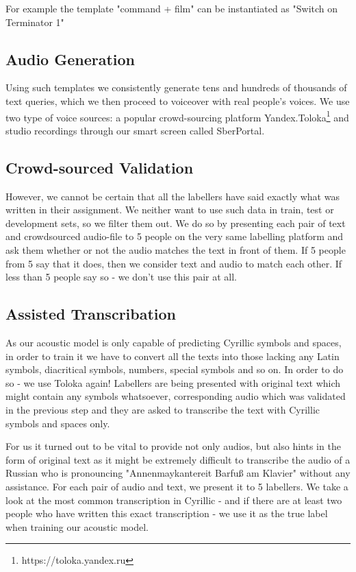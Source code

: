 \documentclass[a4paper]{article}
\begin{document}
For example the template "command + film" can be instantiated as "Switch on Terminator 1"


\subsection{Audio Generation}
Using such templates we consistently generate tens and hundreds of thousands of text queries, which we then proceed to voiceover with real people's voices. We use two type of voice sources: a popular crowd-sourcing platform Yandex.Toloka\footnote{https://toloka.yandex.ru} and studio recordings through our smart screen called SberPortal.

\subsection{Crowd-sourced Validation}
However, we cannot be certain that all the labellers have said exactly what was written in their assignment. We neither want to use such data in train, test or development sets, so we filter them out. We do so by presenting each pair of text and crowdsourced audio-file to 5 people on the very same labelling platform and ask them whether or not the audio matches the text in front of them. If 5 people from 5 say that it does, then we consider text and audio to match each other. If less than 5 people say so - we don't use this pair at all.

\subsection{Assisted Transcribation}
As our acoustic model is only capable of predicting Cyrillic symbols and spaces, in order to train it we have to convert all the texts into those lacking any Latin symbols, diacritical symbols, numbers, special symbols and so on. In order to do so - we use Toloka again! Labellers are being presented with original text which might contain any symbols whatsoever, corresponding audio which was validated in the previous step and they are asked to transcribe the text with Cyrillic symbols and spaces only. 

For us it turned out to be vital to provide not only audios, but also hints in the form of original text as it might be extremely difficult to transcribe the audio of a Russian who is pronouncing "Annenmaykantereit Barfuß am Klavier"  without any assistance. For each pair of audio and text, we present it to 5 labellers. We take a look at the most common transcription in Cyrillic - and if there are at least two people who have written this exact transcription - we use it as the true label when training our acoustic model.
\end{document}
